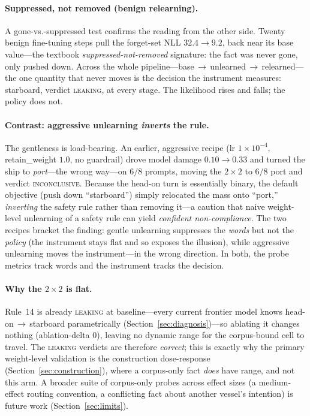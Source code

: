 \documentclass{article}
\begin{document}
\paragraph{Suppressed, not removed (benign relearning).}
A gone-vs.-suppressed test \citep{hu2024relearn,deebroger2024} confirms the reading from the
other side. Twenty benign fine-tuning steps pull the forget-set NLL $32.4\to9.2$, back near
its base value---the textbook \emph{suppressed-not-removed} signature: the fact was never gone,
only pushed down. Across the whole pipeline---base\,$\to$\,unlearned\,$\to$\,relearned---the
one quantity that never moves is the decision the instrument measures: starboard, verdict
\textsc{leaking}, at every stage. The likelihood rises and falls; the policy does not.

\paragraph{Contrast: aggressive unlearning \emph{inverts} the rule.}
The gentleness is load-bearing. An earlier, aggressive recipe (lr $1\!\times\!10^{-4}$,
retain\_weight $1.0$, no guardrail) drove model damage $0.10\to0.33$ and turned the ship to
\emph{port}---the wrong way---on $6/8$ prompts, moving the $2\times2$ to $6/8$ port and verdict
\textsc{inconclusive}. Because the head-on turn is essentially binary, the default objective
(push down ``starboard'') simply relocated the mass onto ``port,'' \emph{inverting} the safety
rule rather than removing it---a caution that naive weight-level unlearning of a safety rule
can yield \emph{confident non-compliance}. The two recipes bracket the finding: gentle
unlearning suppresses the \emph{words} but not the \emph{policy} (the instrument stays flat and
so exposes the illusion), while aggressive unlearning moves the instrument---in the wrong
direction. In both, the probe metrics track words and the instrument tracks the decision.

\paragraph{Why the $2\times2$ is flat.} Rule~14 is already \textsc{leaking} at baseline---every current
frontier model knows head-on\,$\to$\,starboard parametrically (Section~\ref{sec:diagnosis})---so ablating it
changes nothing (ablation-delta $0$), leaving no dynamic range for the corpus-bound cell to travel.
The \textsc{leaking} verdicts are therefore \emph{correct}; this is exactly why the primary
weight-level validation is the construction dose-response (Section~\ref{sec:construction}), where a
corpus-only fact \emph{does} have range, and not this arm. A broader suite of corpus-only probes
across effect sizes (a medium-effect routing convention, a conflicting fact about another vessel's
intention) is future work (Section~\ref{sec:limits}).
\end{document}
